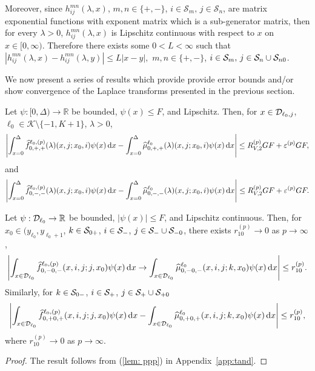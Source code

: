 Moreover, since \(h_{ij}^{mn}(\lambda,x)\), \(m,n\in \{+,-\}\), \(i\in\mathcal S_m,\,j\in\mathcal S_n\), are matrix exponential functions with exponent matrix which is a sub-generator matrix, then for every \(\lambda >0\), \(h_{ij}^{mn}(\lambda,x)\) is Lipschitz continuous with respect to \(x\) on \(x\in[0,\infty)\). Therefore there exists some \(0<L<\infty\) such that \(\left|h_{ij}^{mn}(\lambda,x)-h_{ij}^{mn}(\lambda,y)\right|\leq L|x-y|,\) \(m,n\in \{+,-\}\), \(i\in\mathcal S_m,\,j\in\mathcal S_n\cup\mathcal{S}_{n0}\).

We now present a series of results which provide provide error bounds and/or show convergence of the Laplace transforms presented in the previous section. 
\begin{lem}\label{lem: Dcoajc}
	Let \(\psi:[0,\Delta)\to \mathbb R\) be bounded, \(\psi(x)\leq F\), and Lipschitz. Then, for \(x\in\mathcal{D}_{\ell_0,j}\), \(\ell_0\in\mathcal K\setminus\{-1,K+1\}\), \(\lambda > 0\),
	\begin{align}
            	\left|\int_{x=0}^\Delta \widehat f^{\ell_0,(p)}_{0,+,+}(\lambda)(x,j; x_0,i)\psi(x)\, \mathrm{d} x - \int_{x=0}^\Delta\widehat \mu^{\ell_0}_{0,+,+}(\lambda)(x,j; x_0,i)\psi(x)\, \mathrm{d} x\right| \leq R_{V,2}^{(p)} GF + \varepsilon^{(p)} GF, \label{eqn: anue}
            \end{align}
            and 
            \begin{align}
            	\left|\int_{x=0}^\Delta \widehat f^{\ell_0,(p)}_{0,-,-}(\lambda)(x,j; x_0,i)\psi(x)\, \mathrm{d} x - \int_{x=0}^\Delta\widehat \mu^{\ell_0}_{0,-,-}(\lambda)(x,j; x_0,i)\psi(x)\, \mathrm{d} x\right| \leq R_{V,2}^{(p)} GF + \varepsilon^{(p)} GF. \label{eqn: anue2}
            \end{align} 
\end{lem}

\begin{cor}\label{cor: Dcoajc}
	Let \(\psi:\mathcal{D}_{\ell_0}\to \mathbb R\) be bounded, \(|\psi(x)|\leq F\), and Lipschitz continuous. Then, for \(x_0\in(y_{\ell_0},y_{\ell_0+1}\), \(k\in\mathcal{S}_{0+}\), \(i\in\mathcal{S}_-\), \(j\in\mathcal{S}_-\cup\mathcal{S}_{-0}\), there exists \(r_{10}^{(p)}\to 0\) as \(p \to \infty\), 
	\begin{align}
		\left|\int_{x\in\mathcal{D}_{\ell_0}} \widehat f_{0,-0,-}^{\ell_0,(p)}(x,i,j;j,x_0)\psi(x)\, \mathrm{d} x  \to \int_{x\in\mathcal{D}_{\ell_0}} \widehat \mu_{0,-0,-}^{\ell_0}(x,i,j;k,x_0)\psi(x)\, \mathrm{d} x\right|\leq r_{10}^{(p)}.\label{eqn:xs}
	\end{align}
	Similarly, for \(k\in\mathcal{S}_{0-}\), \(i\in\mathcal{S}_+\), \(j\in\mathcal{S}_+\cup\mathcal{S}_{+0}\)
	\begin{align}
		\left|\int_{x\in\mathcal{D}_{\ell_0}} \widehat f_{0,+0,+}^{\ell_0,(p)}(x,i,j;j,x_0)\psi(x)\, \mathrm{d} x  - \int_{x\in\mathcal{D}_{\ell_0}} \widehat \mu_{0,+0,+}^{\ell_0}(x,i,j;k,x_0)\psi(x)\, \mathrm{d} x\right|\leq r_{10}^{(p)},\label{eqn:!124mcds}
	\end{align}
	where \(r_{10}^{(p)}\to 0\) as \(p\to \infty\). 
\end{cor}
\begin{proof}
	The result follows from (\ref{lem: ppp}) in Appendix~\ref{app:tand}.
\end{proof}

